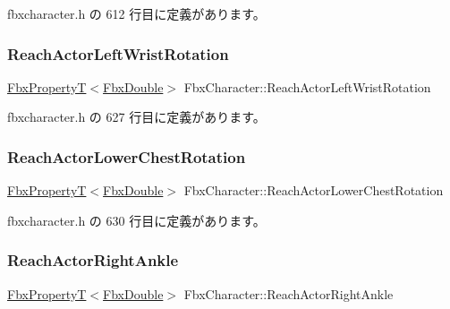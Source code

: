  fbxcharacter.\+h の 612 行目に定義があります。

\mbox{\label{class_fbx_character_ac011fdca558e2018ae4cb2209df328e2}} 
\subsubsection{\texorpdfstring{Reach\+Actor\+Left\+Wrist\+Rotation}{ReachActorLeftWristRotation}}
{\footnotesize\ttfamily \hyperlink{class_fbx_property_t}{Fbx\+PropertyT}$<$\hyperlink{fbxtypes_8h_a171e72a1c46fc15c1a6c9c31948c1c5b}{Fbx\+Double}$>$ Fbx\+Character\+::\+Reach\+Actor\+Left\+Wrist\+Rotation}



 fbxcharacter.\+h の 627 行目に定義があります。

\mbox{\label{class_fbx_character_a1c9c043f80be7d8e7ce15b67d8e66239}} 
\subsubsection{\texorpdfstring{Reach\+Actor\+Lower\+Chest\+Rotation}{ReachActorLowerChestRotation}}
{\footnotesize\ttfamily \hyperlink{class_fbx_property_t}{Fbx\+PropertyT}$<$\hyperlink{fbxtypes_8h_a171e72a1c46fc15c1a6c9c31948c1c5b}{Fbx\+Double}$>$ Fbx\+Character\+::\+Reach\+Actor\+Lower\+Chest\+Rotation}



 fbxcharacter.\+h の 630 行目に定義があります。

\mbox{\label{class_fbx_character_abab10ebadfb1879a264e48dccd429874}} 
\subsubsection{\texorpdfstring{Reach\+Actor\+Right\+Ankle}{ReachActorRightAnkle}}
{\footnotesize\ttfamily \hyperlink{class_fbx_property_t}{Fbx\+PropertyT}$<$\hyperlink{fbxtypes_8h_a171e72a1c46fc15c1a6c9c31948c1c5b}{Fbx\+Double}$>$ Fbx\+Character\+::\+Reach\+Actor\+Right\+Ankle}



